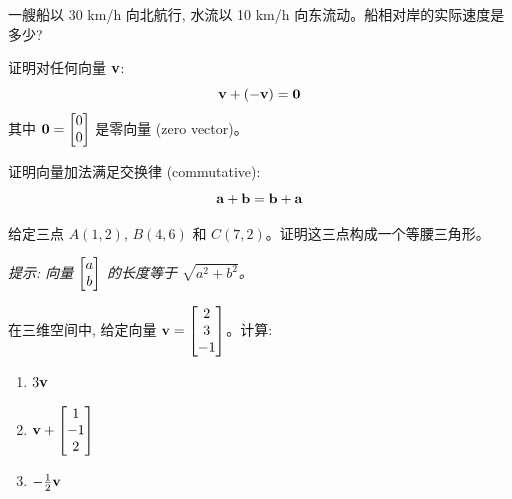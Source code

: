 \begin{exercise}[应用]
一艘船以 30 km/h 向北航行, 水流以 10 km/h 向东流动。船相对岸的实际速度是多少?
\end{exercise}

\begin{exercise}
证明对任何向量 $\mathbf{v}$:
\[
\mathbf{v} + (-\mathbf{v}) = \mathbf{0}
\]
其中 $\mathbf{0} = \begin{bmatrix} 0 \\ 0 \end{bmatrix}$ 是零向量 (zero vector)。
\end{exercise}

\begin{exercise}
证明向量加法满足交换律 (commutative):
\[
\mathbf{a} + \mathbf{b} = \mathbf{b} + \mathbf{a}
\]
\end{exercise}

\begin{exercise}[挑战]
给定三点 $A(1,2)$, $B(4,6)$ 和 $C(7,2)$。证明这三点构成一个等腰三角形。

\textit{提示: 向量 $\begin{bmatrix} a \\ b \end{bmatrix}$ 的长度等于 $\sqrt{a^2 + b^2}$。}
\end{exercise}

\begin{problem}
在三维空间中, 给定向量 $\mathbf{v} = \begin{bmatrix} 2 \\ 3 \\ -1 \end{bmatrix}$。计算:
\begin{enumerate}[label=(\alph*)]
    \item $3\mathbf{v}$
    \item $\mathbf{v} + \begin{bmatrix} 1 \\ -1 \\ 2 \end{bmatrix}$
    \item $-\frac{1}{2}\mathbf{v}$
\end{enumerate}
\end{problem}
